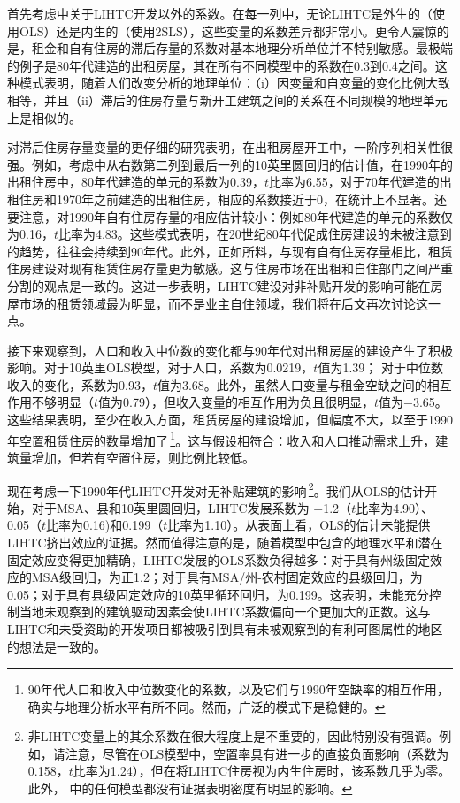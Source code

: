 \documentclass[lang=cn,11pt,a4paper]{paper}
\begin{document}
首先考虑中关于LIHTC开发以外的系数。在每一列中，无论LIHTC是外生的（使用OLS）还是内生的（使用2SLS），这些变量的系数差异都非常小。更令人震惊的是，租金和自有住房的滞后存量的系数对基本地理分析单位并不特别敏感。最极端的例子是80年代建造的出租房屋，其在所有不同模型中的系数在0.3到0.4之间。这种模式表明，随着人们改变分析的地理单位：（i）因变量和自变量的变化比例大致相等，并且（ii）滞后的住房存量与新开工建筑之间的关系在不同规模的地理单元上是相似的。

对滞后住房存量变量的更仔细的研究表明，在出租房屋开工中，一阶序列相关性很强。例如，考虑中从右数第二列到最后一列的10英里圆回归的估计值，在1990年的出租住房中，80年代建造的单元的系数为0.39，$t$比率为6.55，对于70年代建造的出租住房和1970年之前建造的出租住房，相应的系数接近于0，在统计上不显著。还要注意，对1990年自有住房存量的相应估计较小：例如80年代建造的单元的系数仅为0.16，$t$比率为4.83。这些模式表明，在20世纪80年代促成住房建设的未被注意到的趋势，往往会持续到90年代。此外，正如所料，与现有自有住房存量相比，租赁住房建设对现有租赁住房存量更为敏感。这与住房市场在出租和自住部门之间严重分割的观点是一致的。这进一步表明，LIHTC建设对非补贴开发的影响可能在房屋市场的租赁领域最为明显，而不是业主自住领域，我们将在后文再次讨论这一点。

接下来观察到，人口和收入中位数的变化都与90年代对出租房屋的建设产生了积极影响。对于10英里OLS模型，对于人口，系数为0.0219，$t$值为1.39； 对于中位数收入的变化，系数为0.93，$t$值为3.68。此外，虽然人口变量与租金空缺之间的相互作用不够明显（$t$值为0.79），但收入变量的相互作用为负且很明显，$t$值为$−$3.65。这些结果表明，至少在收入方面，租赁房屋的建设增加，但幅度不大，以至于1990年空置租赁住房的数量增加了\,\footnote{90年代人口和收入中位数变化的系数，以及它们与1990年空缺率的相互作用，确实与地理分析水平有所不同。然而，广泛的模式下是稳健的。}。这与假设相符合：收入和人口推动需求上升，建筑量增加，但若有空置住房，则比例比较低。

现在考虑一下1990年代LIHTC开发对无补贴建筑的影响\,\footnote{非LIHTC变量上的其余系数在很大程度上是不重要的，因此特别没有强调。例如，请注意，尽管在OLS模型中，空置率具有进一步的直接负面影响（系数为0.158，$t$比率为1.24），但在将LIHTC住房视为内生住房时，该系数几乎为零。此外， 中的任何模型都没有证据表明密度有明显的影响。}。我们从OLS的估计开始，对于MSA、县和10英里圆回归，LIHTC发展系数为 $+$1.2（$t$比率为4.90）、0.05（$t$比率为0.16)和0.199（$t$比率为1.10）。从表面上看，OLS的估计未能提供LIHTC挤出效应的证据。然而值得注意的是，随着模型中包含的地理水平和潜在固定效应变得更加精确，LIHTC发展的OLS系数负得越多：对于具有州级固定效应的MSA级回归，为正1.2；对于具有MSA/州-农村固定效应的县级回归，为0.05；对于具有县级固定效应的10英里循环回归，为0.199。这表明，未能充分控制当地未观察到的建筑驱动因素会使LIHTC系数偏向一个更加大的正数。这与LIHTC和未受资助的开发项目都被吸引到具有未被观察到的有利可图属性的地区的想法是一致的。
\end{document}
